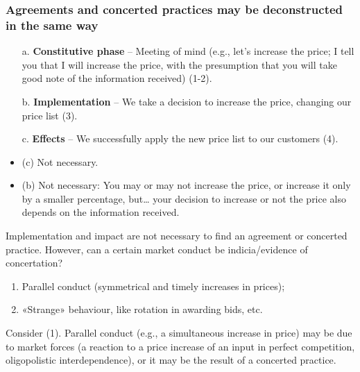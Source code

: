         \subsubsection{Agreements and concerted practices may be deconstructed in the same way}

            \begin{enumerate}
                \item[a.] \textbf{Constitutive phase} – Meeting of mind (e.g., let’s increase the price; I tell you that I will increase the price, with the presumption that you will take good note of the information received) (1-2).
                \item[b.] \textbf{Implementation} – We take a decision to increase the price, changing our price list (3).
                \item[c.] \textbf{Effects} – We successfully apply the new price list to our customers (4).
            \end{enumerate}
            
            \begin{itemize}
                \item (c) Not necessary.
                \item (b) Not necessary: You may or may not increase the price, or increase it only by a smaller percentage, but… your decision to increase or not the price also depends on the information received.
            \end{itemize}


            \noindent Implementation and impact are not necessary to find an agreement or concerted practice. However, can a certain market conduct be indicia/evidence of concertation?

            \begin{enumerate}
                \item Parallel conduct (symmetrical and timely increases in prices);
                \item «Strange» behaviour, like rotation in awarding bids, etc.
            \end{enumerate}
            
            \noindent Consider (1). Parallel conduct (e.g., a simultaneous increase in price) may be due to market forces (a reaction to a price increase of an input in perfect competition, oligopolistic interdependence), or it may be the result of a concerted practice.
            
